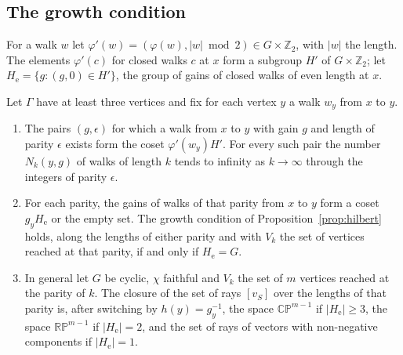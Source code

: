 \subsection{The growth condition}
For a walk $w$ let $\varphi'(w)=(\varphi(w),|w|\bmod2)\in G\times\mathbb{Z}_2$, with $|w|$ the length. The elements $\varphi'(c)$ for closed walks $c$ at $x$ form a subgroup $H'$ of $G\times\mathbb{Z}_2$; let $H_{\mathrm e}=\{g:(g,0)\in H'\}$, the group of gains of closed walks of even length at $x$.

\begin{proposition}\label{prop:growth}
Let $\Gamma$ have at least three vertices and fix for each vertex $y$ a walk $w_y$ from $x$ to $y$.
\begin{enumerate}[label=(\alph*)]
\item The pairs $(g,\epsilon)$ for which a walk from $x$ to $y$ with gain $g$ and length of parity $\epsilon$ exists form the coset $\varphi'(w_y)H'$. For every such pair the number $N_k(y,g)$ of walks of length $k$ tends to infinity as $k\to\infty$ through the integers of parity $\epsilon$.
\item For each parity, the gains of walks of that parity from $x$ to $y$ form a coset $g_yH_{\mathrm e}$ or the empty set. The growth condition of Proposition~\ref{prop:hilbert} holds, along the lengths of either parity and with $V_k$ the set of vertices reached at that parity, if and only if $H_{\mathrm e}=G$.
\item In general let $G$ be cyclic, $\chi$ faithful and $V_k$ the set of $m$ vertices reached at the parity of $k$. The closure of the set of rays $[v_S]$ over the lengths of that parity is, after switching by $h(y)=g_y^{-1}$, the space $\mathbb{CP}^{m-1}$ if $|H_{\mathrm e}|\ge3$, the space $\mathbb{RP}^{m-1}$ if $|H_{\mathrm e}|=2$, and the set of rays of vectors with non-negative components if $|H_{\mathrm e}|=1$.
\end{enumerate}
\end{proposition}
